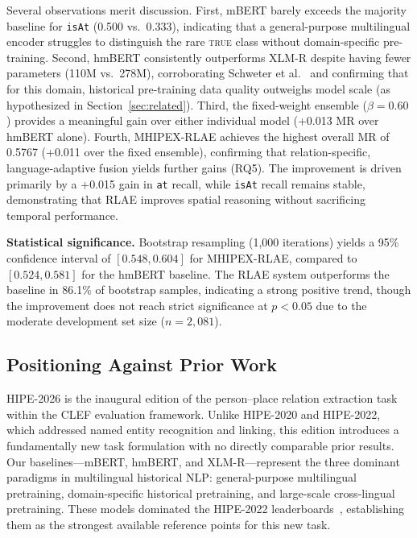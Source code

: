 \documentclass[11pt,a4paper]{article}
\begin{document}
Several observations merit discussion. First, mBERT barely exceeds the majority baseline for \texttt{isAt} (0.500 vs.\ 0.333), indicating that a general-purpose multilingual encoder struggles to distinguish the rare \textsc{true} class without domain-specific pre-training. Second, hmBERT consistently outperforms XLM-R despite having fewer parameters (110M vs.\ 278M), corroborating Schweter et al.~\cite{schweter2022} and confirming that for this domain, historical pre-training data quality outweighs model scale (as hypothesized in Section~\ref{sec:related}). Third, the fixed-weight ensemble ($\beta=0.60$) provides a meaningful gain over either individual model (+0.013 MR over hmBERT alone). Fourth, MHIPEX-RLAE achieves the highest overall MR of 0.5767 (+0.011 over the fixed ensemble), confirming that relation-specific, language-adaptive fusion yields further gains (RQ5). The improvement is driven primarily by a +0.015 gain in \texttt{at} recall, while \texttt{isAt} recall remains stable, demonstrating that RLAE improves spatial reasoning without sacrificing temporal performance.

\textbf{Statistical significance.} Bootstrap resampling (1{,}000 iterations) yields a 95\% confidence interval of $[0.548, 0.604]$ for MHIPEX-RLAE, compared to $[0.524, 0.581]$ for the hmBERT baseline. The RLAE system outperforms the baseline in 86.1\% of bootstrap samples, indicating a strong positive trend, though the improvement does not reach strict significance at $p<0.05$ due to the moderate development set size ($n=2{,}081$).



\subsection{Positioning Against Prior Work}

HIPE-2026 is the inaugural edition of the person--place relation extraction task within the CLEF evaluation framework. Unlike HIPE-2020 and HIPE-2022, which addressed named entity recognition and linking, this edition introduces a fundamentally new task formulation with no directly comparable prior results. Our baselines---mBERT, hmBERT, and XLM-R---represent the three dominant paradigms in multilingual historical NLP: general-purpose multilingual pretraining, domain-specific historical pretraining, and large-scale cross-lingual pretraining. These models dominated the HIPE-2022 leaderboards~\cite{schweter2022,ehrmann2022}, establishing them as the strongest available reference points for this new task.
\end{document}
